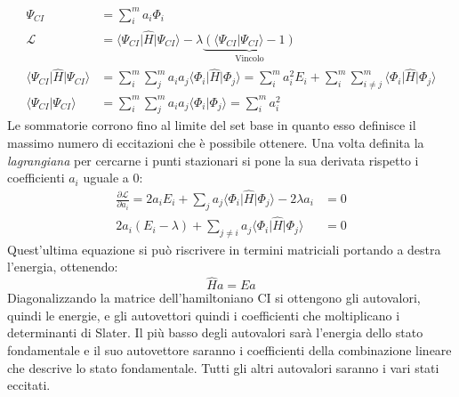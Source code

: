 \documentclass[oneside]{amsbook}
\numberwithin{section}{chapter}
\numberwithin{equation}{section}
\numberwithin{figure}{section}
\begin{document}
\begin{equation}
\begin{aligned}
\Psi_{CI}&= \sum \limits _i ^{m} a_i \Phi_i \\
\mathcal{L} &= \langle\Psi_{CI}\vert\hat{H}\vert\Psi_{CI}\rangle-\lambda\underbrace{(\langle\Psi_{CI}\vert\Psi_{CI}\rangle-1)}_{\text{Vincolo}}\\
\langle\Psi_{CI}\vert\hat{H}\vert\Psi_{CI}\rangle &= \sum \limits _i ^{m}\sum \limits _j ^{m} a_i a_j \langle\Phi_{i}\vert\hat{H}\vert\Phi_{j}\rangle =\sum \limits _i ^{m} a_i ^2 E_i + \sum \limits _i ^{m}\sum \limits _{i\neq j} ^{m}\langle\Phi_{i}\vert\hat{H}\vert\Phi_{j}\rangle \\
\langle\Psi_{CI}\vert\Psi_{CI}\rangle &= \sum \limits _i ^{m}\sum \limits _j ^{m} a_i a_j \langle\Phi_{i}\vert\Phi_{j}\rangle =  \sum \limits _i ^{m}a_i ^2
\end{aligned}
\end{equation}
Le sommatorie corrono fino al limite del set base in quanto esso definisce il massimo numero di eccitazioni che è possibile ottenere.
Una volta definita la \emph{lagrangiana} per cercarne i punti stazionari si pone la sua derivata rispetto i coefficienti $a_i$ uguale a $0$:
\begin{equation}
\begin{aligned}
\frac{\partial \mathcal{L}}{\partial a_i} = 2a_i E_i + \sum \limits_j a_j \langle\Phi_{i}\vert\hat{H}\vert\Phi_{j}\rangle -2\lambda a_i &=0\\
2 a_i (E_i - \lambda) + \sum \limits_{j\neq i}a_j \langle\Phi_{i}\vert\hat{H}\vert\Phi_{j}\rangle &= 0
\end{aligned}
\end{equation}
Quest'ultima equazione si può riscrivere in termini matriciali portando a destra l'energia,  ottenendo:
\begin{equation}
\hat{H}a=Ea
\end{equation}
Diagonalizzando la matrice dell'hamiltoniano CI si ottengono gli autovalori, quindi le energie, e gli autovettori quindi i coefficienti che moltiplicano i determinanti di Slater. Il più basso degli autovalori sarà l'energia dello stato fondamentale e il suo autovettore saranno i coefficienti della combinazione lineare che descrive lo stato fondamentale. Tutti gli altri autovalori saranno i vari stati eccitati.
\end{document}
